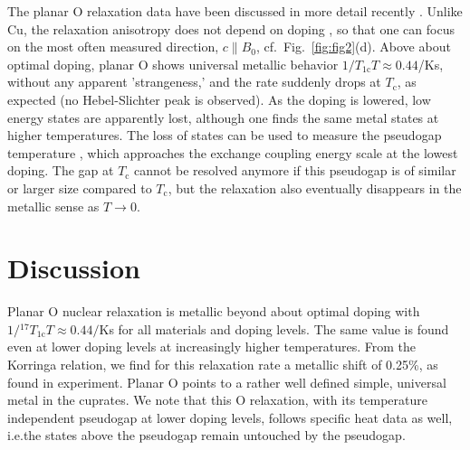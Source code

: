 \documentclass[preprint,superscriptaddress,amsmath,amssymb,aps,physrev,prb,floatfix, fleqn]{revtex4-2} \usepackage{bm} %
\makeatletter
\newcommand{\tc} {\ensuremath{T_{\mathrm c}}\@\xspace}
\newcommand{\cpara}{\ensuremath{{c\parallel\xspace B_0}}\@\xspace}
\makeatother
\begin{document}
The planar O relaxation data have been discussed in more detail recently \cite{Nachtigal2020}. Unlike Cu, the relaxation anisotropy does not depend on doping \cite{Avramovska2022b}, so that one can focus on the most often measured direction, \cpara, cf.~Fig.~\ref{fig:fig2}(d). Above about optimal doping, planar O shows universal metallic behavior $1/T_{1\mathrm{c}}T \approx 0.44$/Ks, without any apparent 'strangeness,' and the rate suddenly drops at \tc, as expected (no Hebel-Slichter peak is observed). As the doping is lowered, low energy states are apparently lost, although one finds the same metal states at higher temperatures. The loss of states can be used to measure the pseudogap temperature \cite{Nachtigal2020}, which approaches the exchange coupling energy scale at the lowest doping. The gap at \tc cannot be resolved anymore if this pseudogap is of similar or larger size compared to \tc, but the relaxation also eventually disappears in the metallic sense as $T\rightarrow 0$.

\section{Discussion}
Planar O nuclear relaxation is metallic beyond about optimal doping with $1/{^{17}T}_{1\mathrm{c}}T \approx 0.44/$Ks for all materials and doping levels. The same value is found even at lower doping levels at increasingly higher temperatures. From the Korringa relation, we find for this relaxation rate a metallic shift of 0.25\%, as found in experiment. Planar O points to a rather well defined simple, universal metal in the cuprates. We note that this O relaxation, with its temperature independent pseudogap at lower doping levels, follows specific heat data \cite{Loram1998,Tallon2022} as well, i.e.\@ the states above the pseudogap remain untouched by the pseudogap.
\end{document}

